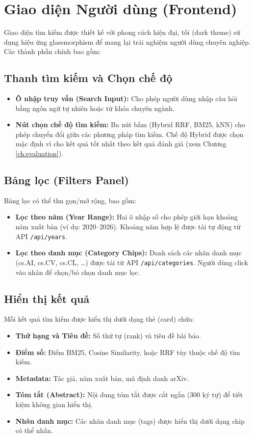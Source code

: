 \section{Giao diện Người dùng (Frontend)}
Giao diện tìm kiếm được thiết kế với phong cách hiện đại, tối (dark theme) sử dụng hiệu ứng glassmorphism để mang lại trải nghiệm người dùng chuyên nghiệp. Các thành phần chính bao gồm:

\subsection{Thanh tìm kiếm và Chọn chế độ}
\begin{itemize}
    \item \textbf{Ô nhập truy vấn (Search Input):} Cho phép người dùng nhập câu hỏi bằng ngôn ngữ tự nhiên hoặc từ khóa chuyên ngành.
    \item \textbf{Nút chọn chế độ tìm kiếm:} Ba nút bấm (Hybrid RRF, BM25, kNN) cho phép chuyển đổi giữa các phương pháp tìm kiếm. Chế độ Hybrid được chọn mặc định vì cho kết quả tốt nhất theo kết quả đánh giá (xem Chương \ref{ch:evaluation}).
\end{itemize}

\subsection{Bảng lọc (Filters Panel)}
Bảng lọc có thể thu gọn/mở rộng, bao gồm:
\begin{itemize}
    \item \textbf{Lọc theo năm (Year Range):} Hai ô nhập số cho phép giới hạn khoảng năm xuất bản (ví dụ: 2020--2026). Khoảng năm hợp lệ được tải tự động từ API \texttt{/api/years}.
    \item \textbf{Lọc theo danh mục (Category Chips):} Danh sách các nhãn danh mục (cs.AI, cs.CV, cs.CL, \ldots) được tải từ API \texttt{/api/categories}. Người dùng click vào nhãn để chọn/bỏ chọn danh mục lọc.
\end{itemize}

\subsection{Hiển thị kết quả}
Mỗi kết quả tìm kiếm được hiển thị dưới dạng thẻ (card) chứa:
\begin{itemize}
    \item \textbf{Thứ hạng và Tiêu đề:} Số thứ tự (rank) và tiêu đề bài báo.
    \item \textbf{Điểm số:} Điểm BM25, Cosine Similarity, hoặc RRF tùy thuộc chế độ tìm kiếm.
    \item \textbf{Metadata:} Tác giả, năm xuất bản, mã định danh arXiv.
    \item \textbf{Tóm tắt (Abstract):} Nội dung tóm tắt được cắt ngắn (300 ký tự) để tiết kiệm không gian hiển thị.
    \item \textbf{Nhãn danh mục:} Các nhãn danh mục (tags) được hiển thị dưới dạng chip có thể nhấn.
\end{itemize}

